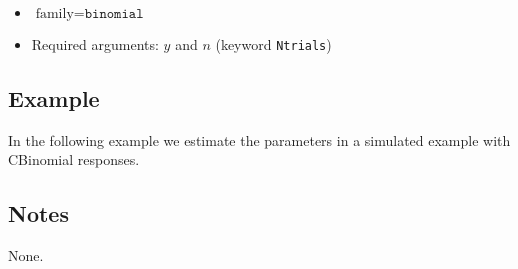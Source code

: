 \documentclass[a4paper,11pt]{article}
\begin{document}
\begin{itemize}
\item $\text{family}=\texttt{binomial}$
\item Required arguments: $y$ and $n$ (keyword \texttt{Ntrials})
\end{itemize}

\subsection*{Example}

In the following example we estimate the parameters in a simulated
example with CBinomial responses.


\subsection*{Notes}

None.
\end{document}
